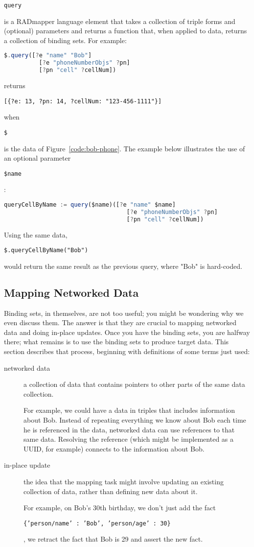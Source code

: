 \documentclass[9pt,letterpaper]{article}
\newcommand{\stt}[1]{\begin{footnotesize}\texttt{#1}\end{footnotesize}}
\begin{document}
\stt{query} is a RADmapper language element that takes a collection of triple forms and (optional) parameters and returns a function that, when applied to data, returns a collection of binding sets.
For example:

\begin{lstlisting}[language=JavaScript]
 $.query([?e "name" "Bob"]
          [?e "phoneNumberObjs" ?pn]
          [?pn "cell" ?cellNum])
\end{lstlisting}

returns \stt{[\{?e: 13, ?pn: 14, ?cellNum: "123-456-1111"\}]} when \stt{\$} is the data of Figure~\ref{code:bob-phone}.
The example below illustrates the use of an optional parameter \stt{\$name}:

\begin{lstlisting}[language=JavaScript]
 queryCellByName := query($name)([?e "name" $name]
                                   [?e "phoneNumberObjs" ?pn]
                                   [?pn "cell" ?cellNum])
\end{lstlisting}

Using the same data, \stt{\$.queryCellByName("Bob")} would return the same result as the previous query, where "Bob" is hard-coded. 

\subsection{Mapping  Networked Data}

Binding sets, in themselves, are not too useful; you might be wondering why we even discuss them.
The answer is that they are crucial to mapping networked data and doing in-place updates.
Once you have the binding sets, you are halfway there; what remains is to use the binding sets to produce target data.
This section describes that process, beginning with definitions of some terms just used:

\begin{description}
\item[networked data] a collection of data that contains pointers to other parts of the same data collection.

  For example, we could have a data in triples that includes information about Bob.
  Instead of repeating everything we know about Bob each time he is referenced in the data,
  networked data can use references to that same data.
  Resolving the reference (which might be implemented as a UUID, for example) connects to the information about Bob.
\item[in-place update] the idea that the mapping task might involve updating an existing collection of data, rather than
  defining new data about it.

  For example, on Bob's 30th birthday, we don't just add the fact \stt{\{'person/name' : 'Bob', 'person/age' : 30\}}, we
  retract the fact that Bob is 29 and assert the new fact.
\end{description}
\end{document}
